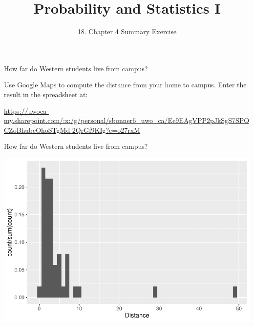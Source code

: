

\newcommand{\lecturenum}{18}

\title[SS2857]{Probability and Statistics I}
\subtitle{\lecturenum. Chapter 4 Summary Exercise}

\date{}







{

\begin{frame}
  \addtocounter{framenumber}{-1}

  \maketitle
\end{frame}
}

\begin{frame}

\begin{block}{How far do Western students live from campus?}

Use Google Maps to compute the distance from your home to campus. Enter the result in the spreadsheet at:
\begin{center}
\url{https://uwoca-my.sharepoint.com/:x:/g/personal/sbonner6_uwo_ca/Ee9EAgVPP2pJkSgS7SPQCZoBhubeOhoSTgMd-2QrGf9KIg?e=o27rxM}
\end{center}
\end{block}
\end{frame}




\begin{frame}
\begin{block}{How far do Western students live from campus?}
\begin{center}
\includegraphics[height=.7\textheight]{figure/histogram-1.pdf}
\end{center}
\end{block}
\end{frame}

